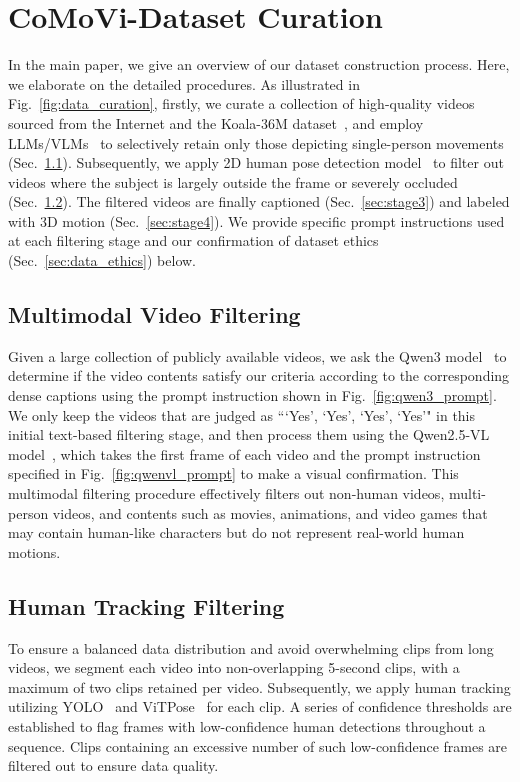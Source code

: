 \section{CoMoVi-Dataset Curation}
\label{sec:dataset_curation}
In the main paper, we give an overview of our dataset construction process. Here, we elaborate on the detailed procedures. As illustrated in Fig.~\ref{fig:data_curation}, firstly, we curate a collection of high-quality videos sourced from the Internet and the Koala-36M dataset~\cite{wang2025koala}, and employ LLMs/VLMs~\cite{qwen3,qwen2.5} to selectively retain only those depicting single-person movements (Sec.~\ref{sec:stage1}). Subsequently, we apply 2D human pose detection model~\cite{redmon2016yolo,xu2022vitpose} to filter out videos where the subject is largely outside the frame or severely occluded (Sec.~\ref{sec:stage2}). The filtered videos are finally captioned (Sec.~\ref{sec:stage3}) and labeled with 3D motion (Sec.~\ref{sec:stage4}). We provide specific prompt instructions used at each filtering stage and our confirmation of dataset ethics (Sec.~\ref{sec:data_ethics}) below.


\subsection{Multimodal Video Filtering}
\label{sec:stage1}

Given a large collection of publicly available videos, we ask the Qwen3 model~\cite{qwen3} to determine if the video contents satisfy our criteria according to the corresponding dense captions using the prompt instruction shown in Fig.~\ref{fig:qwen3_prompt}. We only keep the videos that are judged as ``\text{[}`Yes', `Yes', `Yes', `Yes'\text{]}" in this initial text-based filtering stage, and then process them using the Qwen2.5-VL model~\cite{qwen2.5}, which takes the first frame of each video and the prompt instruction specified in Fig.~\ref{fig:qwenvl_prompt} to make a visual confirmation. This multimodal filtering procedure effectively filters out non-human videos, multi-person videos, and contents such as movies, animations, and video games that may contain human-like characters but do not represent real-world human motions.

\subsection{Human Tracking Filtering}
\label{sec:stage2}

To ensure a balanced data distribution and avoid overwhelming clips from long videos, we segment each video into non-overlapping 5-second clips, with a maximum of two clips retained per video. Subsequently, we apply human tracking utilizing YOLO~\cite{redmon2016yolo} and ViTPose~\cite{xu2022vitpose} for each clip. A series of confidence thresholds are established to flag frames with low-confidence human detections throughout a sequence. Clips containing an excessive number of such low-confidence frames are filtered out to ensure data quality.

